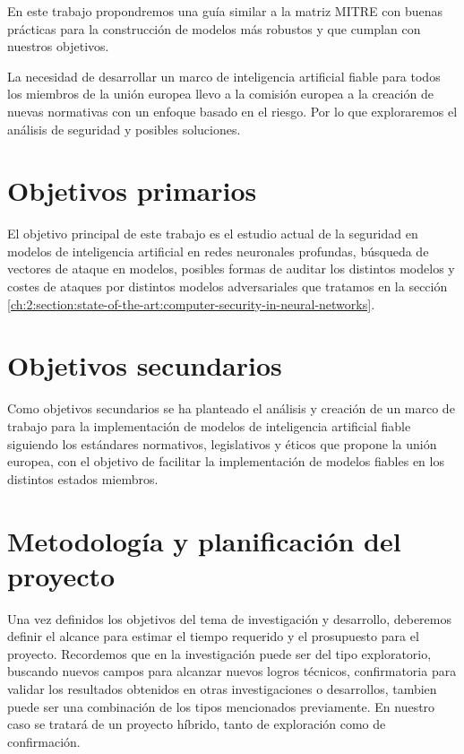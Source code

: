 En este trabajo propondremos una guía similar a la matriz \gls{MITRE} con buenas prácticas para la construcción de modelos más robustos y que cumplan con nuestros objetivos.

La necesidad de desarrollar un marco de inteligencia artificial fiable para todos los miembros de la unión europea llevo a la comisión europea a la creación de nuevas normativas con un enfoque basado en el riesgo.
Por lo que exploraremos el análisis de seguridad y posibles soluciones.


\section{Objetivos primarios}
El objetivo principal de este trabajo es el estudio actual de la seguridad en modelos de inteligencia artificial en redes neuronales profundas, búsqueda de vectores de ataque en modelos, posibles formas de auditar los distintos modelos y costes de ataques por distintos modelos adversariales que tratamos en la sección \ref{ch:2:section:state-of-the-art:computer-security-in-neural-networks}.


\section{Objetivos secundarios}
Como objetivos secundarios se ha planteado el análisis y creación de un marco de trabajo para la implementación de modelos de inteligencia artificial fiable siguiendo los estándares normativos, legislativos y éticos que propone la unión europea, con el objetivo de facilitar la implementación de modelos fiables en los distintos estados miembros.

\section{Metodología y planificación del proyecto}

Una vez definidos los objetivos del tema de investigación y desarrollo, deberemos definir el alcance para estimar el tiempo requerido y el prosupuesto para el proyecto.
Recordemos que en la investigación puede ser del tipo exploratorio, buscando nuevos campos para alcanzar nuevos logros técnicos, confirmatoria para validar los resultados obtenidos en otras investigaciones o desarrollos, tambien puede ser una combinación de los tipos mencionados previamente.
En nuestro caso se tratará de un proyecto híbrido, tanto de exploración como de confirmación.

